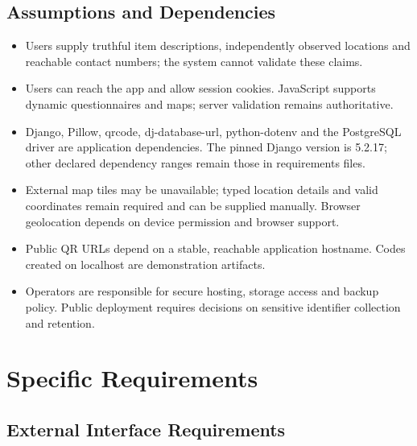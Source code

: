 \documentclass[12pt,a4paper,oneside]{report}
\begin{document}

\section{Assumptions and Dependencies}

\begin{itemize}

\item Users supply truthful item descriptions, independently observed locations and reachable contact numbers; the system cannot validate these claims.

\item Users can reach the app and allow session cookies. JavaScript supports dynamic questionnaires and maps; server validation remains authoritative.

\item Django, Pillow, qrcode, dj-database-url, python-dotenv and the PostgreSQL driver are application dependencies. The pinned Django version is 5.2.17; other declared dependency ranges remain those in requirements files.

\item External map tiles may be unavailable; typed location details and valid coordinates remain required and can be supplied manually. Browser geolocation depends on device permission and browser support.

\item Public QR URLs depend on a stable, reachable application hostname. Codes created on localhost are demonstration artifacts.

\item Operators are responsible for secure hosting, storage access and backup policy. Public deployment requires decisions on sensitive identifier collection and retention.

\end{itemize}

\chapter{Specific Requirements}


\section{External Interface Requirements}

\end{document}
